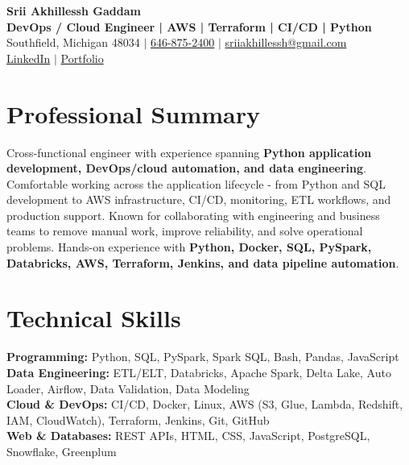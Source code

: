 \documentclass[letterpaper,10pt]{article}
\begin{document}
\fontsize{9.35pt}{10.45pt}\selectfont

\begin{center}
    {\LARGE \textbf{Srii Akhillessh Gaddam}} \\[-1pt]
    \textbf{DevOps / Cloud Engineer | AWS | Terraform | CI/CD | Python} \\[2pt]
    Southfield, Michigan 48034 $|$
    \href{tel:6468752400}{646-875-2400} $|$
    \href{mailto:sriiakhillessh@gmail.com}{sriiakhillessh@gmail.com} \\[1pt]
    \href{https://www.linkedin.com/in/srii-akhiilessh-gaddam-b48668191/}{LinkedIn} $|$
    \href{https://sriiakhillesshg.github.io/portfolio/}{Portfolio}
\end{center}
\vspace{-8pt}

\section{Professional Summary}
\small{Cross-functional engineer with experience spanning \textbf{Python application development, DevOps/cloud automation, and data engineering}. Comfortable working across the application lifecycle - from Python and SQL development to AWS infrastructure, CI/CD, monitoring, ETL workflows, and production support. Known for collaborating with engineering and business teams to remove manual work, improve reliability, and solve operational problems. Hands-on experience with \textbf{Python, Docker, SQL, PySpark, Databricks, AWS, Terraform, Jenkins, and data pipeline automation}.}

\section{Technical Skills}
\small{
\textbf{Programming:} Python, SQL, PySpark, Spark SQL, Bash, Pandas, JavaScript \\
\textbf{Data Engineering:} ETL/ELT, Databricks, Apache Spark, Delta Lake, Auto Loader, Airflow, Data Validation, Data Modeling \\
\textbf{Cloud \& DevOps:} CI/CD, Docker, Linux, AWS (S3, Glue, Lambda, Redshift, IAM, CloudWatch), Terraform, Jenkins, Git, GitHub \\
\textbf{Web \& Databases:} REST APIs, HTML, CSS, JavaScript, PostgreSQL, Snowflake, Greenplum
}
\end{document}
